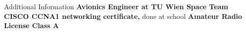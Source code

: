 \begin{rubric}{Additional Information}
\entry* \textbf{Avionics Engineer at TU Wien Space Team}
\entry* \textbf{CISCO CCNA1 networking certificate,} done at school
\entry* \textbf{Amateur Radio License Class A}

%
%
\end{rubric}
